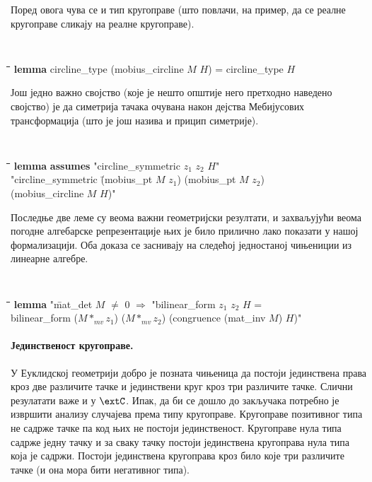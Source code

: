 \noindent Поред овога чува се и тип кругоправе (што повлачи, на
пример, да се реалне кругоправе сликају на реалне кругоправе).

{\tt
\begin{tabbing}
\hspace{5mm}\=\hspace{5mm}\=\hspace{5mm}\=\hspace{5mm}\=\hspace{5mm}\=\kill
{\bf lemma} circline\_type (mobius\_circline $M$ $H$) = circline\_type $H$
\end{tabbing}
}

Још једно важно својство (које је нешто општије него претходно
наведено својство) је да симетрија тачака очувана након дејства
Мебијусових трансформација (што је још назива и прицип симетрије).

{\tt
\begin{tabbing}
\hspace{5mm}\=\hspace{5mm}\=\hspace{5mm}\=\hspace{5mm}\=\hspace{5mm}\=\kill
{\bf lemma} \={\bf assumes} "circline\_symmetric $z_1$ $z_2$ $H$"\\
 "circline\_symmetric \=(mobius\_pt $M$ $z_1$) (mobius\_pt $M$ $z_2$)\\
\>\>(mobius\_circline $M$ $H$)"
\end{tabbing}
}

Последње две леме су веома важни геометријски резултати, и захваљујући
веома погодне алгебарске репрезентације њих је било прилично лако
показати у нашој формализацији. Оба доказа се заснивају на следећој
једностаној чињениции из линеарне алгебре.  {\tt
\begin{tabbing}
\hspace{5mm}\=\hspace{5mm}\=\hspace{5mm}\=\hspace{5mm}\=\hspace{5mm}\=\kill
{\bf lemma} "\=mat\_det $M$ $\neq$ $0$ $\Longrightarrow$ "bilinear\_form $z_1$ $z_2$ $H$ = \\
\>bilinear\_form ($M *_{mv} z_1$) ($M *_{mv} z_2$) (congruence (mat\_inv $M$) $H$)"
\end{tabbing}
}


\paragraph{Јединственост кругоправе.}
У Еуклидској геометрији добро је позната чињеница да постоји
јединствена права кроз две различите тачке и јединствени круг кроз три
различите тачке. Слични резулатати важе и у $\extC$.  Ипак, да би се
дошло до закључака потребно је извршити анализу случајева према типу
кругоправе.  Кругоправе позитивног типа не садрже тачке па код њих не
постоји јединственост. Кругоправе нула типа садрже једну тачку и за
сваку тачку постоји јединствена кругоправа нула типа која је
садржи. Постоји јединствена кругоправа кроз било које три различите
тачке (и она мора бити негативног типа).
 
